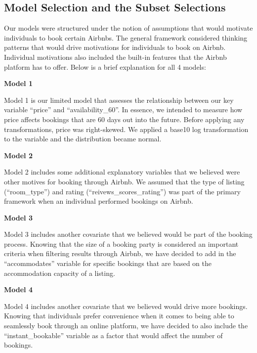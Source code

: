 \documentclass[
]{article}
\begin{document}
\hypertarget{model-selection-and-the-subset-selections}{%
\subsection{Model Selection and the Subset Selections}\label{model-selection-and-the-subset-selections}}

Our models were structured under the notion of assumptions that would motivate individuals to book certain Airbnbs. The general framework considered thinking patterns that would drive motivations for individuals to book on Airbnb. Individual motivations also included the built-in features that the Airbnb platform has to offer. Below is a brief explanation for all 4 models:

\textbf{Model 1}

Model 1 is our limited model that assesses the relationship between our key variable ``price'' and ``availability\_60''. In essence, we intended to measure how price affects bookings that are 60 days out into the future. Before applying any transformations, price was right-skewed. We applied a base10 log transformation to the variable and the distribution became normal.

\textbf{Model 2}

Model 2 includes some additional explanatory variables that we believed were other motives for booking through Airbnb. We assumed that the type of listing (``room\_type'') and rating (``reivews\_scores\_rating'') was part of the primary framework when an individual performed bookings on Airbnb.

\textbf{Model 3}

Model 3 includes another covariate that we believed would be part of the booking process. Knowing that the size of a booking party is considered an important criteria when filtering results through Airbnb, we have decided to add in the ``accommodates'' variable for specific bookings that are based on the accommodation capacity of a listing.

\textbf{Model 4}

Model 4 includes another covariate that we believed would drive more bookings. Knowing that individuals prefer convenience when it comes to being able to seamlessly book through an online platform, we have decided to also include the ``instant\_bookable'' variable as a factor that would affect the number of bookings.
\end{document}

